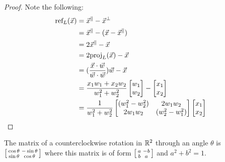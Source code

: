 \documentclass[a4paper,11pt]{article}
\begin{document}
\begin{outline}
    \begin{proof}
      Note the following:
      \begin{align*}
        \text{ref}_{L}(\vec{x}) &= \vec{x}^{\parallel} - \vec{x}^{\perp}\\
                                &= \vec{x}^{\parallel} - (\vec{x} - \vec{x}^{\parallel})\\
                                &= 2\vec{x}^{\parallel} - \vec{x}\\
                                &= 2\text{proj}_{L}(\vec{x})- \vec{x}\\
                                &= (\frac{\vec{x}\cdot\vec{w}}{\vec{w}\cdot\vec{w}})\vec{w} - \vec{x}\\
                                &= \frac{x_1w_1 + x_2w_2}{w_1^2 + w_2^2} \begin{bmatrix} w_1 \\ w_2 
                                   \end{bmatrix}-\begin{bmatrix} x_1 \\ x_2 \end{bmatrix}\\
                                &= \frac{1}{w_1^2 + w_2^2}
                                   \begin{bmatrix}
                                     (w_1^2 - w_2^2) & 2w_1w_2 \\ 
                                     2w_1w_2 & (w_2^2 - w_1^2) 
                                   \end{bmatrix}
                                   \begin{bmatrix} x_1 \\ x_2 \end{bmatrix}
      \end{align*}
    \end{proof}
    
    The matrix of a counterclockwise rotation in \(\mathbb{R}^2\) through an angle \(\theta\) is 
    \(\begin{bsmallmatrix} \cos{\theta} & -\sin{\theta} \\ \sin{\theta} & \cos{\theta} \end{bsmallmatrix}\) 
    where this matrix is of form \(\begin{bsmallmatrix} a & -b \\ b & a \end{bsmallmatrix}\) and \(a^2 + b^2 = 1\).
    

\end{outline}
\end{document}
